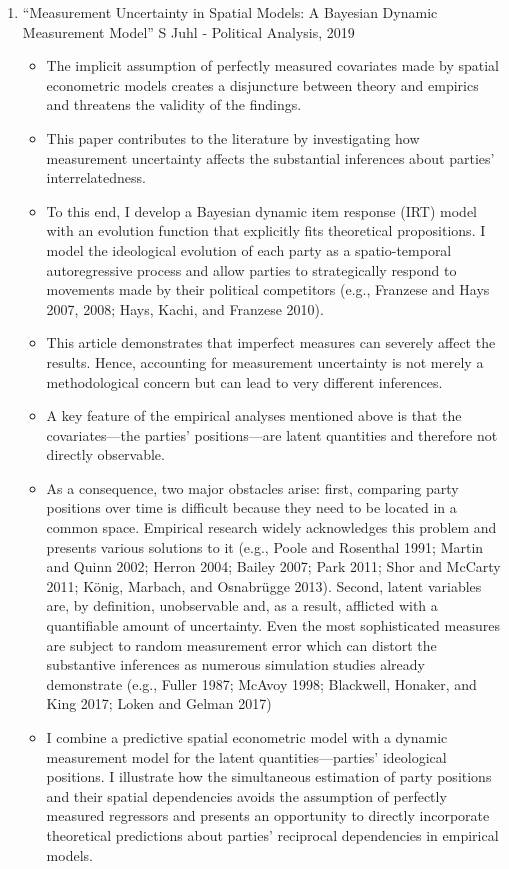 \documentclass[a4paper,12pt]{article}
\begin{document}
\begin{enumerate}
\item “Measurement Uncertainty in Spatial Models: A Bayesian Dynamic Measurement Model” S Juhl - Political Analysis, 2019 
\begin{itemize}
\item The implicit assumption of perfectly measured covariates made by spatial econometric models creates a disjuncture between theory and empirics and threatens the validity of the findings. 
\item This paper contributes to the literature by investigating how measurement uncertainty affects the substantial inferences about parties’ interrelatedness.  
\item To this end, I develop a Bayesian dynamic item response (IRT) model with an evolution function that explicitly fits theoretical propositions. I model the ideological evolution of each party as a spatio-temporal autoregressive process and allow parties to strategically respond to movements made by their political competitors (e.g., Franzese and Hays 2007, 2008; Hays, Kachi, and Franzese 2010). 
\item This article demonstrates that imperfect measures can severely affect the results. Hence, accounting for measurement uncertainty is not merely a methodological concern but can lead to very different inferences. 
\item A key feature of the empirical analyses mentioned above is that the covariates—the parties’ positions—are latent quantities and therefore not directly observable.  
\item As a consequence, two major obstacles arise: first, comparing party positions over time is difficult because they need to be located in a common space. Empirical research widely acknowledges this problem and presents various solutions to it (e.g., Poole and Rosenthal 1991; Martin and Quinn 2002; Herron 2004; Bailey 2007; Park 2011; Shor and McCarty 2011; König, Marbach, and Osnabrügge 2013). Second, latent variables are, by definition, unobservable and, as a result, afflicted with a quantifiable amount of uncertainty. Even the most sophisticated measures are subject to random measurement error which can distort the substantive inferences as numerous simulation studies already demonstrate (e.g., Fuller 1987; McAvoy 1998; Blackwell, Honaker, and King 2017; Loken and Gelman 2017) 
\item I combine a predictive spatial econometric model with a dynamic measurement model for the latent quantities—parties’ ideological positions. I illustrate how the simultaneous estimation of party positions and their spatial dependencies avoids the assumption of perfectly measured regressors and presents an opportunity to directly incorporate theoretical predictions about parties’ reciprocal dependencies in empirical models. 


\end{itemize}
\end{enumerate}
\end{document}
